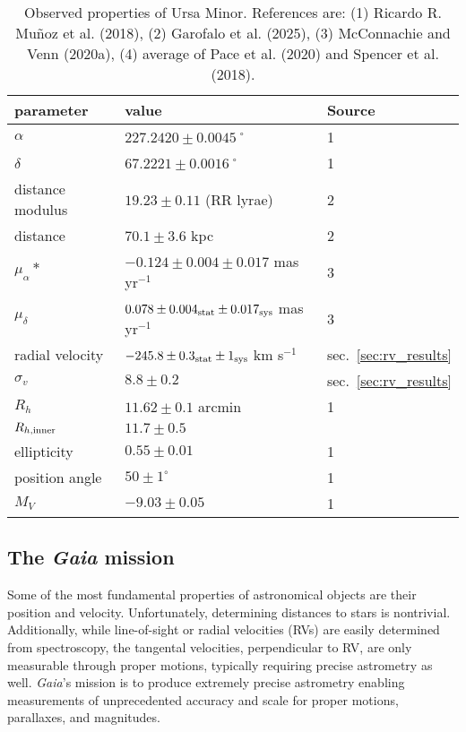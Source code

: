 \begin{table*}[t]
\centering
\caption[Observed Properties of Ursa Minor]{Observed properties of Ursa Minor. References are: (1) Ricardo R. Muñoz et al. (2018), (2) Garofalo et al. (2025), (3) McConnachie and Venn (2020a), (4) average of Pace et al. (2020) and Spencer et al. (2018). }
\label{tbl:umi_obs_props}
\begin{tabular}{lll}
\toprule
parameter & value & Source\\
\midrule
$\alpha$ & $ 227.2420 \pm 0.0045$˚ & 1\\
$\delta$ & $67.2221 \pm 0.0016$˚ & 1\\
distance modulus & $19.23 \pm 0.11$ (RR lyrae) & 2\\
distance & $70.1 \pm 3.6$ kpc & 2\\
$\mu_\alpha*$ & $-0.124 \pm 0.004 \pm 0.017$ mas yr$^{-1}$ & 3\\
$\mu_\delta$ & $0.078 \pm 0.004_{\rm stat} \pm 0.017_{\rm sys}$ mas yr$^{-1}$ & 3\\
radial velocity & $-245.8 \pm 0.3_{\rm stat} \pm 1_{\rm sys}$ km s$^{-1}$ & sec. \ref{sec:rv_results}\\
$\sigma_v$ & $8.8 \pm 0.2$ & sec. \ref{sec:rv_results}\\
$R_h$ & $11.62 \pm 0.1$ arcmin & 1\\
$R_{h, \rm inner}$ & $11.7\pm0.5$ & \\
ellipticity & $0.55 \pm 0.01$ & 1\\
position angle & $50 \pm 1^\circ$ & 1\\
$M_V$ & $-9.03 \pm 0.05$ & 1\\
\bottomrule
\end{tabular}
\end{table*}

\subsection{\texorpdfstring{The \emph{Gaia}
mission}{The Gaia mission}}\label{the-gaia-mission}

Some of the most fundamental properties of astronomical objects are
their position and velocity. Unfortunately, determining distances to
stars is nontrivial. Additionally, while line-of-sight or radial
velocities (RVs) are easily determined from spectroscopy, the tangental
velocities, perpendicular to RV, are only measurable through proper
motions, typically requiring precise astrometry as well. \emph{Gaia}'s
mission is to produce extremely precise astrometry enabling measurements
of unprecedented accuracy and scale for proper motions, parallaxes, and
magnitudes.

